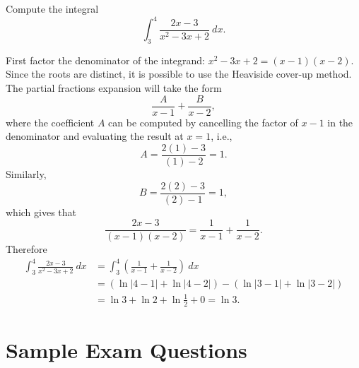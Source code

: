 \documentclass{ximera}
\begin{document}
\begin{question}%

Compute the integral
\[\int_{3}^{4}\frac{2x-3}{x^2-3x+2}~dx.\]
\begin{multiplechoice}
\end{multiplechoice}
\begin{feedback}
First factor the denominator of the integrand: \(x^2-3x+2 = (x-1)(x-2)\). Since the roots are distinct, it is possible to use the Heaviside cover-up method.  The partial fractions expansion will take the form \[\frac{A}{x-1} + \frac{B}{x-2}, \] where the coefficient \(A\) can be computed by cancelling the factor of \(x-1\) in the denominator and evaluating the result at \(x = 1\), i.e., \[A = \frac{2(1)-3}{(1)-2} = 1. \] Similarly, \[B = \frac{2(2)-3}{(2)-1} = 1,\] which gives that \[\frac{2x-3}{(x-1)(x-2)} = \frac{1}{x-1} + \frac{1}{x-2}. \] Therefore
\[ \begin{aligned} 
\int_{3}^{4}\frac{2x-3}{x^2-3x+2}~dx & = \int_{3}^{4}\left(\frac{1}{x-1} + \frac{1}{x-2}\right)~dx \\
 & = \left(\ln |4-1| + \ln |4-2| \right) - \left(\ln |3-1| + \ln |3-2| \right)\\
 & = \ln 3 + \ln 2 + \ln \frac{1}{2} + 0 = \ln 3.\end{aligned}\]
\end{feedback}

\end{question}

\section*{Sample Exam Questions}
\end{document}
